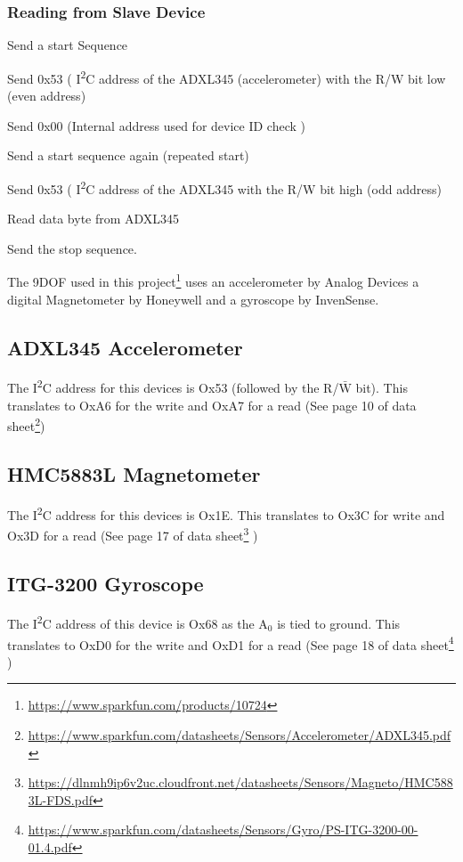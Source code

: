 \newpage 

\tocless\subsubsection{Reading from Slave Device}
\begin{enumerate*}
	\item Send a start Sequence
	\item Send 0x53 ( I\textsuperscript{2}C address of the ADXL345 (accelerometer) with the R/W bit low (even address)
	\item Send 0x00  (Internal address used for device ID check )
	\item Send a start sequence again (repeated start)
	\item Send 0x53  ( I\textsuperscript{2}C address of the ADXL345  with the R/W bit high (odd address)
	\item Read data byte from ADXL345
	\item Send the stop sequence.
\end{enumerate*}

The 9DOF used in this project\footnote{\url{https://www.sparkfun.com/products/10724}} uses an accelerometer by Analog Devices  a digital Magnetometer by Honeywell and a  gyroscope  by InvenSense.

\tocless\subsection{ADXL345 Accelerometer}
The I\textsuperscript{2}C address for this devices is Ox53 (followed by the R/$\bar{\mathrm{W}}$ bit). This translates to OxA6 for the write and OxA7 for a read (See page 10 of data sheet\footnote{\url{https://www.sparkfun.com/datasheets/Sensors/Accelerometer/ADXL345.pdf}}) 

\tocless\subsection{HMC5883L Magnetometer}
The I\textsuperscript{2}C address for this devices is Ox1E. This translates to Ox3C for write and Ox3D for a read (See page 17 of data sheet\footnote{\url{https://dlnmh9ip6v2uc.cloudfront.net/datasheets/Sensors/Magneto/HMC5883L-FDS.pdf}} ) 


\tocless\subsection {ITG-3200 Gyroscope}
The I\textsuperscript{2}C address of this device is Ox68 as the $\mathrm{A}_0$ is tied to ground. This translates to OxD0 for the write and OxD1 for a read (See page 18 of data sheet\footnote{\url{https://www.sparkfun.com/datasheets/Sensors/Gyro/PS-ITG-3200-00-01.4.pdf}} )